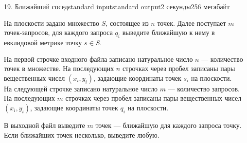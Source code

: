 \begin{problem}{19. Ближайший сосед}{standard input}{standard output}{2 секунды}{256 мегабайт}

На плоскости задано множество $S$, состоящее из $n$ точек. Далее поступает $m$ точек-запросов, для каждого запроса $q_i$ выведите ближайшую к нему в евклидовой метрике точку $s \in S$.

\InputFile

На первой строчке входного файла записано натуральное число $n$ — количество точек в множестве. На последующих $n$ строчках через пробел записаны пары вещественных чисел $(x_i, y_i)$, задающие координаты точек $s_i$ на плоскости. \\
На следующей строчке записано натуральное число $m$ — количество запросов. На последующих $m$ строчках через пробел записаны пары вещественных чисел $(x_i, y_i)$, задающие координаты точек $q_i$ на плоскости. 

\OutputFile
В выходной файл выведите $m$ точек — ближайшую для каждого запроса точку. Если ближайших точек несколько, выведите любую.

\Examples

\begin{example}%
%
%
\end{example}

\end{problem}
